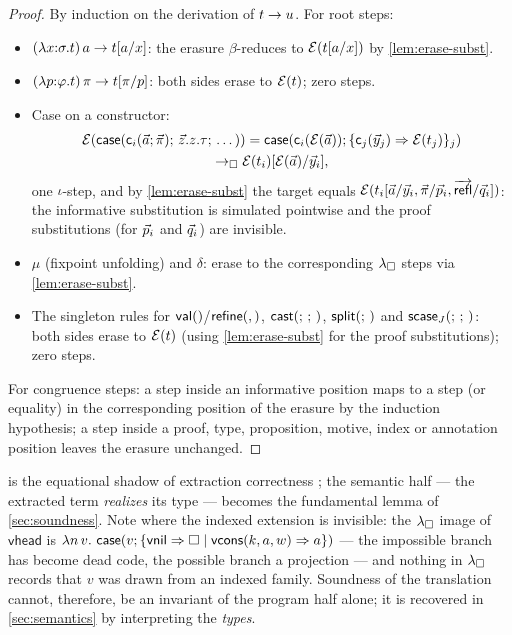 \begin{proof}
By induction on the derivation of $t \rightarrow u$.  For root steps:
\begin{itemize}[leftmargin=2em]
\item $(\lambda x{:}\sigma.t)\,a \rightarrow t[a/x]$: the erasure
  $\beta$-reduces to $\mathcal{E}(t[a/x])$ by \cref{lem:erase-subst}.
\item $(\lambda p{:}\varphi.t)\,\pi \rightarrow t[\pi/p]$: both sides
  erase to $\mathcal{E}(t)$; zero steps.
\item Case on a constructor:
  \begin{multline*}
    \mathcal{E}(\mathsf{case}(\mathsf{c}_i(\vec{a};\vec{\pi});\,\vec{z}.z.\tau;\,\dots))
    = \mathsf{case}(\mathsf{c}_i(\mathcal{E}(\vec{a})); \{\mathsf{c}_j(\vec{y}_j)
      \Rightarrow \mathcal{E}(t_j)\}_j)\\
    \rightarrow_{\square} \mathcal{E}(t_i)[\mathcal{E}(\vec{a})/\vec{y}_i],
  \end{multline*}
  one $\iota$-step, and by \cref{lem:erase-subst} the target equals
  $\mathcal{E}(t_i[\vec{a}/\vec{y}_i, \vec{\pi}/\vec{p}_i,
  \overrightarrow{\mathsf{refl}}/\vec{q}_i])$: the informative
  substitution is simulated pointwise and the proof substitutions (for
  $\vec{p}_i$ and $\vec{q}_i$) are invisible.
\item $\mu$ (fixpoint unfolding) and $\delta$: erase to the
  corresponding $\lambda_{\square}$ steps via \cref{lem:erase-subst}.
\item The singleton rules for $\mathsf{val}()$/$\mathsf{refine}(,)$, $\mathsf{cast}(;\,;\,)$,
  $\mathsf{split}(;\,)$ and $\mathsf{scase}_{J}(;\,;\,)$: both sides erase to $\mathcal{E}(t)$
  (using \cref{lem:erase-subst} for the proof substitutions); zero
  steps.
\end{itemize}
For congruence steps: a step inside an informative position maps to a
step (or equality) in the corresponding position of the erasure by the
induction hypothesis; a step inside a proof, type, proposition, motive,
index or annotation position leaves the erasure unchanged.
\end{proof}

\begin{remark}
 is the equational shadow of extraction correctness
\cite[\S 2.3]{Letouzey2004}; the semantic half --- the extracted term
\emph{realizes} its type --- becomes the fundamental lemma of
\cref{sec:soundness}.  Note where the indexed extension is invisible: the
$\lambda_{\square}$ image of $\mathsf{vhead}$ is
$\lambda n\,v.\ \mathsf{case}(v; \{\mathsf{vnil} \Rightarrow \square \mid
\mathsf{vcons}(k,a,w) \Rightarrow a\})$ --- the impossible branch has become
dead code, the possible branch a projection --- and nothing in $\lambda_{\square}$
records that $v$ was drawn from an indexed family.  Soundness of the
translation cannot, therefore, be an invariant of the program half
alone; it is recovered in \cref{sec:semantics} by interpreting the
\emph{types}.
\end{remark}
